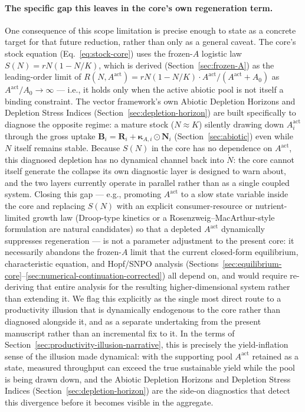 \documentclass[twocolumn,10pt]{article}
\begin{document}
\paragraph{The specific gap this leaves in the core's own regeneration term.} One consequence of this scope limitation is precise enough to state as a concrete target for that future reduction, rather than only as a general caveat. The core's stock equation (Eq.~\eqref{eq:stock-core}) uses the frozen-$A$ logistic law $S(N)=rN(1-N/K)$, which is derived (Section~\ref{sec:frozen-A}) as the leading-order limit of $R(N,A^{\text{act}})=rN(1-N/K)\cdot A^{\text{act}}/(A^{\text{act}}+A_0)$ as $A^{\text{act}}/A_0\to\infty$ --- i.e., it holds only when the active abiotic pool is not itself a binding constraint. The vector framework's own Abiotic Depletion Horizons and Depletion Stress Indices (Section~\ref{sec:depletion-horizon}) are built specifically to diagnose the opposite regime: a mature stock ($N\approx K$) silently drawing down $A^{\text{act}}_i$ through the gross uptake $\mathbf B_i=\mathbf R_i+\boldsymbol\kappa_{A,i}\odot\mathbf N_i$ (Section~\ref{sec:abiotic}) even while $N$ itself remains stable. Because $S(N)$ in the core has no dependence on $A^{\text{act}}$, this diagnosed depletion has no dynamical channel back into $\dot N$: the core cannot itself generate the collapse its own diagnostic layer is designed to warn about, and the two layers currently operate in parallel rather than as a single coupled system. Closing this gap --- e.g., promoting $A^{\text{act}}$ to a slow state variable inside the core and replacing $S(N)$ with an explicit consumer-resource or nutrient-limited growth law (Droop-type kinetics \cite{droop1973} or a Rosenzweig--MacArthur-style formulation \cite{rosenzweig1963} are natural candidates) so that a depleted $A^{\text{act}}$ dynamically suppresses regeneration --- is not a parameter adjustment to the present core: it necessarily abandons the frozen-$A$ limit that the current closed-form equilibrium, characteristic equation, and Hopf/SNPO analysis (Sections~\ref{sec:equilibrium-core}--\ref{sec:numerical-continuation-corrected}) all depend on, and would require re-deriving that entire analysis for the resulting higher-dimensional system rather than extending it. We flag this explicitly as the single most direct route to a productivity illusion that is dynamically endogenous to the core rather than diagnosed alongside it, and as a separate undertaking from the present manuscript rather than an incremental fix to it. In the terms of Section~\ref{sec:productivity-illusion-narrative}, this is precisely the yield-inflation sense of the illusion made dynamical: with the supporting pool $A^{\text{act}}$ retained as a state, measured throughput can exceed the true sustainable yield while the pool is being drawn down, and the Abiotic Depletion Horizons and Depletion Stress Indices (Section~\ref{sec:depletion-horizon}) are the side-on diagnostics that detect this divergence before it becomes visible in the aggregate.
\end{document}
